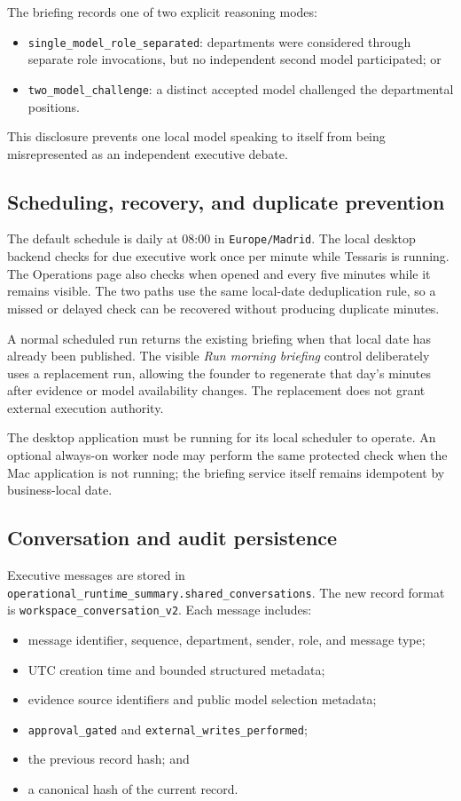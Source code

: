 The briefing records one of two explicit reasoning modes:
\begin{itemize}[leftmargin=*]
\item \texttt{single\_model\_role\_separated}: departments were considered through separate role
      invocations, but no independent second model participated; or
\item \texttt{two\_model\_challenge}: a distinct accepted model challenged the departmental
      positions.
\end{itemize}

This disclosure prevents one local model speaking to itself from being misrepresented as an
independent executive debate.

\subsection{Scheduling, recovery, and duplicate prevention}

The default schedule is daily at 08:00 in \texttt{Europe/Madrid}.  The local desktop backend checks
for due executive work once per minute while Tessaris is running.  The Operations page also checks
when opened and every five minutes while it remains visible.  The two paths use the same local-date
deduplication rule, so a missed or delayed check can be recovered without producing duplicate
minutes.

A normal scheduled run returns the existing briefing when that local date has already been
published.  The visible \emph{Run morning briefing} control deliberately uses a replacement run,
allowing the founder to regenerate that day's minutes after evidence or model availability changes.
The replacement does not grant external execution authority.

The desktop application must be running for its local scheduler to operate.  An optional always-on
worker node may perform the same protected check when the Mac application is not running; the
briefing service itself remains idempotent by business-local date.

\subsection{Conversation and audit persistence}

Executive messages are stored in
\texttt{operational\_runtime\_summary.shared\_conversations}.  The new record format is
\texttt{workspace\_conversation\_v2}.  Each message includes:
\begin{itemize}[leftmargin=*]
\item message identifier, sequence, department, sender, role, and message type;
\item UTC creation time and bounded structured metadata;
\item evidence source identifiers and public model selection metadata;
\item \texttt{approval\_gated} and \texttt{external\_writes\_performed};
\item the previous record hash; and
\item a canonical hash of the current record.
\end{itemize}

